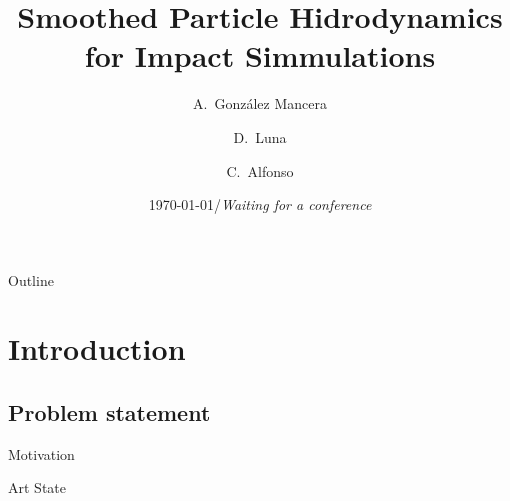 \documentclass[10pt]{beamer}
\title[Smoothed Particle Hidrodynamics]
{Smoothed Particle Hidrodynamics for Impact Simmulations}
\author[A. González-Mancera et al.] %
{A.~González Mancera\inst{1} \and D.~Luna\inst{1} \and C.~Alfonso\inst{1}}
\institute[Universidad de los Andes] %
{
  \inst{1}%
  Department of Mechanical Engineering\\
  Universidad de los Andes
}
\date[APS - DFD 2015] %
{\today/\textit{Waiting for a conference}}
\begin{document}
\begin{frame}
  \titlepage
\end{frame}

 \begin{frame}{Outline}
   \tableofcontents
 \end{frame}




\section{Introduction}

\subsection{Problem statement}

\begin{frame}{Motivation}

  
\end{frame}
\begin{frame}{Art State}

\end{frame}
\end{document}
